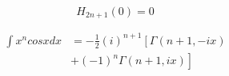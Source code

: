 \[\begin{equation} \label{thrm5.4(ii)} H_{2n+1}(0) = 0 \end{equation}\]

\[\begin{align} \int x^n cos x dx &= -\frac{1}{2}(i)^{n+1}\left [ \Gamma(n+1, -ix) \right . \nonumber \\\ & \left . + (-1)^n \Gamma(n+1, ix)\right] \end{align}\]

